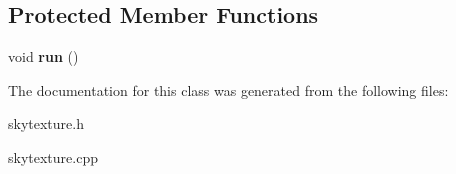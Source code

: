\subsection*{Protected Member Functions}
\begin{DoxyCompactItemize}
\item 
\hypertarget{classSkyTexture_aa2e57e6c8db4fd2129530621ee31a4bf}{
void {\bfseries run} ()}
\label{classSkyTexture_aa2e57e6c8db4fd2129530621ee31a4bf}

\end{DoxyCompactItemize}


The documentation for this class was generated from the following files:\begin{DoxyCompactItemize}
\item 
skytexture.h\item 
skytexture.cpp\end{DoxyCompactItemize}

